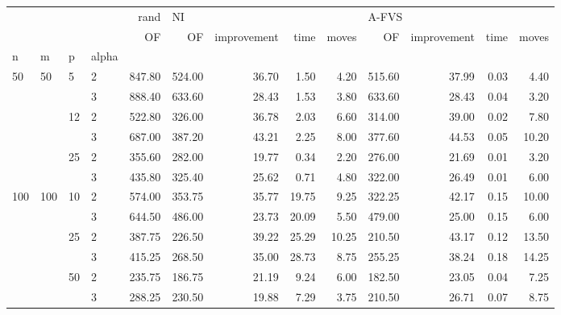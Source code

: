 \begin{tabular}{llllrrrrrrrrr}
\toprule
    &     &     &   &   rand & \multicolumn{4}{l}{NI} & \multicolumn{4}{l}{A-FVS} \\
    &     &     &   &     OF &     OF & improvement &    time & moves &     OF & improvement & time & moves \\
n & m & p & alpha &        &        &             &         &       &        &             &      &       \\
\midrule
\multirow{6}{*}{50} & \multirow{6}{*}{50} & \multirow{2}{*}{5} & 2 & 847.80 & 524.00 &       36.70 &    1.50 &  4.20 & 515.60 &       37.99 & 0.03 &  4.40 \\
    &     &     & 3 & 888.40 & 633.60 &       28.43 &    1.53 &  3.80 & 633.60 &       28.43 & 0.04 &  3.20 \\
\cline{3-13}
    &     & \multirow{2}{*}{12} & 2 & 522.80 & 326.00 &       36.78 &    2.03 &  6.60 & 314.00 &       39.00 & 0.02 &  7.80 \\
    &     &     & 3 & 687.00 & 387.20 &       43.21 &    2.25 &  8.00 & 377.60 &       44.53 & 0.05 & 10.20 \\
\cline{3-13}
    &     & \multirow{2}{*}{25} & 2 & 355.60 & 282.00 &       19.77 &    0.34 &  2.20 & 276.00 &       21.69 & 0.01 &  3.20 \\
    &     &     & 3 & 435.80 & 325.40 &       25.62 &    0.71 &  4.80 & 322.00 &       26.49 & 0.01 &  6.00 \\
\cline{1-13}
\cline{2-13}
\cline{3-13}
\multirow{6}{*}{100} & \multirow{6}{*}{100} & \multirow{2}{*}{10} & 2 & 574.00 & 353.75 &       35.77 &   19.75 &  9.25 & 322.25 &       42.17 & 0.15 & 10.00 \\
    &     &     & 3 & 644.50 & 486.00 &       23.73 &   20.09 &  5.50 & 479.00 &       25.00 & 0.15 &  6.00 \\
\cline{3-13}
    &     & \multirow{2}{*}{25} & 2 & 387.75 & 226.50 &       39.22 &   25.29 & 10.25 & 210.50 &       43.17 & 0.12 & 13.50 \\
    &     &     & 3 & 415.25 & 268.50 &       35.00 &   28.73 &  8.75 & 255.25 &       38.24 & 0.18 & 14.25 \\
\cline{3-13}
    &     & \multirow{2}{*}{50} & 2 & 235.75 & 186.75 &       21.19 &    9.24 &  6.00 & 182.50 &       23.05 & 0.04 &  7.25 \\
    &     &     & 3 & 288.25 & 230.50 &       19.88 &    7.29 &  3.75 & 210.50 &       26.71 & 0.07 &  8.75 \\
\cline{1-13}
\cline{2-13}

\end{tabular}
